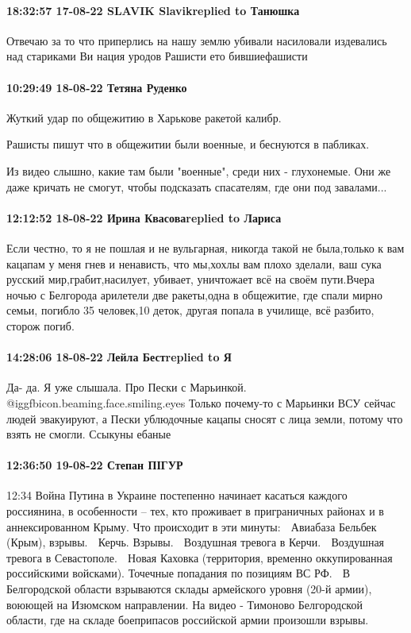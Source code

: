\paragraph{18:32:57 17-08-22 SLAVIK Slavikreplied to Танюшка}

Отвечаю за то что приперлись на нашу землю убивали насиловали издевались над
стариками Ви нация уродов Рашисти ето бившиефашисти

\paragraph{10:29:49 18-08-22 Тетяна Руденко}

Жуткий удар по общежитию в Харькове ракетой калибр.

Рашисты пишут что в общежитии были военные, и беснуются в пабликах.

Из видео слышно, какие там были "военные", среди них - глухонемые. Они же даже
кричать не смогут, чтобы подсказать спасателям, где они под завалами...

\paragraph{12:12:52 18-08-22 Ирина Квасоваreplied to Лариса}

Если честно, то я не пошлая и не вульгарная, никогда такой не была,только к вам
кацапам у меня гнев и ненависть, что мы,хохлы вам плохо зделали, ваш сука
русский мир,грабит,насилует, убивает, уничтожает всё на своём пути.Вчера ночью
с Белгорода арилетели две ракеты,одна в общежитие, где спали мирно семьи,
погибло 35 человек,10 деток, другая попала в училище, всё разбито, сторож
погиб.

\paragraph{14:28:06 18-08-22 Лейла Бестreplied to Я}

Да- да. Я уже слышала. Про Пески с Марьинкой.  @igg{fbicon.beaming.face.smiling.eyes}  Только почему-то с Марьинки
ВСУ сейчас людей эвакуируют, а Пески ублюдочные кацапы сносят с лица земли,
потому что взять не смогли. Ссыкуны ебаные

\paragraph{12:36:50 19-08-22 Степан ПІГУР}

12:34
Война Путина в Украине постепенно начинает касаться каждого россиянина, в особенности – тех, кто проживает в приграничных районах и в аннексированном Крыму. Что происходит в эти минуты:
🔺 Авиабаза Бельбек (Крым), взрывы.
🔺 Керчь. Взрывы.
🔺 Воздушная тревога в Керчи.
🔺 Воздушная тревога в Севастополе.
🔺 Новая Каховка (территория, временно оккупированная российскими войсками). Точечные попадания по позициям ВС РФ.
🔺 В Белгородской области взрываются склады армейского уровня (20-й армии), воюющей на Изюмском направлении.
На видео - Тимоново Белгородской области, где на складе боеприпасов российской армии произошли взрывы.

